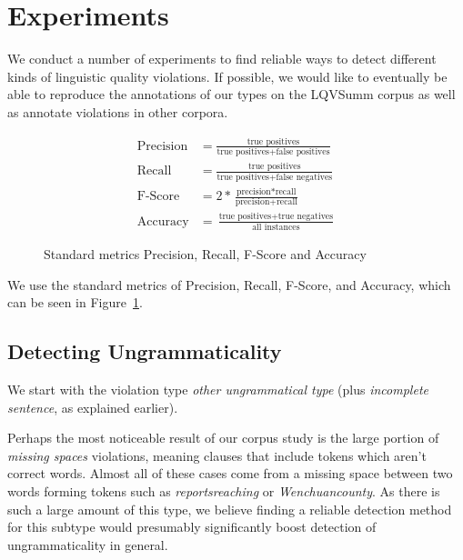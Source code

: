 \documentclass[a4paper,10pt]{scrartcl}
\theoremstyle{style}
\begin{document}
\section{Experiments}
\label{experiments}
We conduct a number of experiments to find reliable ways to detect different kinds of linguistic quality violations. If possible, we would like to eventually be able to reproduce the annotations of our types on the LQVSumm corpus as well as annotate violations in other corpora.

\begin{figure}
	\begin{subequations*}
	\begin{align*}
		\text{Precision} &= \frac{\text{true positives}}{\text{true positives} + \text{false positives}}\\
		\text{Recall} &= \frac{\text{true positives}}{\text{true positives} + \text{false negatives}}\\
		\text{F-Score} &= 2*\frac{\text{precision}*\text{recall}}{\text{precision}+\text{recall}}\\
		\text{Accuracy} &= \frac{\text{true positives}+\text{true negatives}}{\text{all instances}}
	\end{align*}
	\end{subequations*}
	\label{metrics}
	\caption{Standard metrics Precision, Recall, F-Score and Accuracy}
\end{figure}

We use the standard metrics of Precision, Recall, F-Score, and Accuracy, which can be seen in Figure~\ref{metrics}.

\subsection{Detecting Ungrammaticality}
\label{sec_unknowntokens}
We start with the violation type \textit{other ungrammatical type} (plus \textit{incomplete sentence}, as explained earlier).

Perhaps the most noticeable result of our corpus study is the large portion of \textit{missing spaces} violations, meaning clauses that include tokens which aren't correct words. Almost all of these cases come from a missing space between two words forming tokens such as \textit{reportsreaching} or \textit{Wenchuancounty}. As there is such a large amount of this type, we believe finding a reliable detection method for this subtype would presumably significantly boost detection of ungrammaticality in general.
\end{document}
